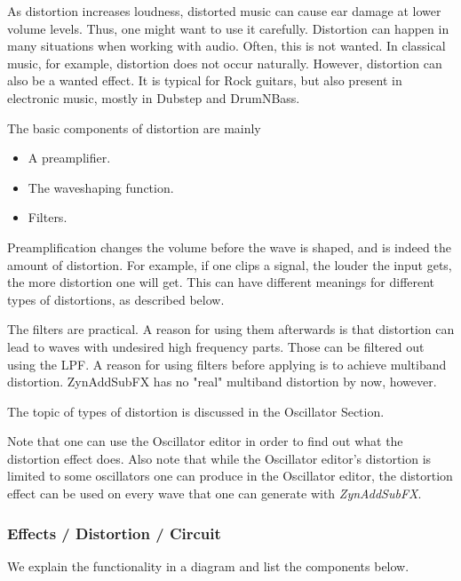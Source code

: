    As distortion increases loudness, distorted music can cause ear damage at
   lower volume levels. Thus, one might want to use it carefully.
   Distortion can happen in many situations when working with audio. Often,
   this is not wanted. In classical music, for example, distortion does not
   occur naturally. However, distortion can also be a wanted effect. It is
   typical for Rock guitars, but also present in electronic music, mostly in
   Dubstep and DrumNBass.

   The basic components of distortion are mainly

   \begin{itemize}
      \item A preamplifier.
      \item The waveshaping function.
      \item Filters.
   \end{itemize}

   Preamplification changes the volume before the wave is shaped, and is
   indeed the amount of distortion. For example, if one clips a signal, the
   louder the input gets, the more distortion one will get. This can have
   different meanings for different types of distortions, as described below.

   The filters are practical. A reason for using them afterwards is that
   distortion can lead to waves with undesired high frequency parts. Those
   can be filtered out using the LPF. A reason for using filters before
   applying is to achieve multiband distortion. ZynAddSubFX has no "real"
   multiband distortion by now, however.

   The topic of types of distortion is discussed in the
   Oscillator Section.

   Note that one can use the Oscillator editor in order
   to find out what the distortion effect does. Also note that while the
   Oscillator editor’s distortion is limited to some oscillators one can
   produce in the Oscillator editor, the distortion effect can be used on
   every wave that one can generate with \textsl{ZynAddSubFX}.

\subsubsection{Effects / Distortion / Circuit}
\label{subsubsec:effects_edit_distortion_circuit}

   We explain the functionality in a diagram and list the components below.

